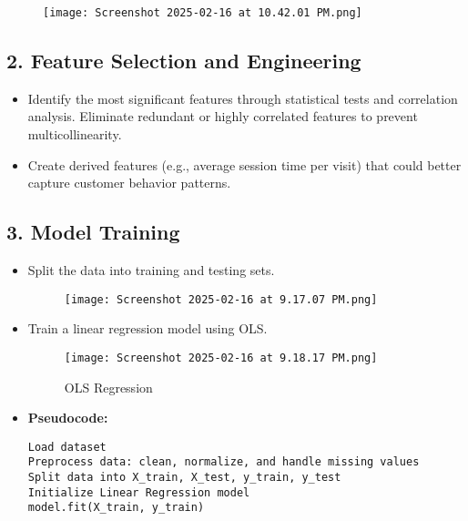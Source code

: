 \documentclass[12pt]{article}
\begin{document}
\begin{figure}[H]
    \centering
    \texttt{[image: Screenshot 2025-02-16 at 10.42.01 PM.png]}
\end{figure}





\subsection*{2. Feature Selection and Engineering}
\begin{itemize}[leftmargin=*, label=\textbullet]
    \item Identify the most significant features through statistical tests and correlation analysis. Eliminate redundant or highly correlated features to prevent multicollinearity.
    \item Create derived features (e.g., average session time per visit) that could better capture customer behavior patterns.

\end{itemize}

\subsection*{3. Model Training}
\begin{itemize}[leftmargin=*, label=\textbullet]
    \item Split the data into training and testing sets.
    

\begin{figure}[H]
    \centering
    \texttt{[image: Screenshot 2025-02-16 at 9.17.07 PM.png]}
\end{figure}

    \item Train a linear regression model using OLS.

    \begin{figure}[H]
    \centering
    \texttt{[image: Screenshot 2025-02-16 at 9.18.17 PM.png]}
    \caption{OLS Regression}
    \label{fig:enter-label}
\end{figure}



    \item \textbf{Pseudocode:}
    \begin{verbatim}
Load dataset
Preprocess data: clean, normalize, and handle missing values
Split data into X_train, X_test, y_train, y_test
Initialize Linear Regression model
model.fit(X_train, y_train)
    \end{verbatim}
\end{itemize}
\end{document}

